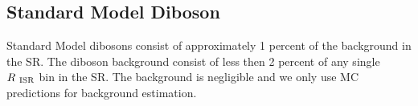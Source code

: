 \subsection{Standard Model Diboson}
\label{sec:Bkg:diboson}

Standard Model dibosons consist of approximately 1 percent of the background in the SR.  The diboson background consist of less then 2 percent of any single $R_{~\mathrm{ISR}}$ bin in the SR.  The background is negligible and we only use MC predictions for background estimation.